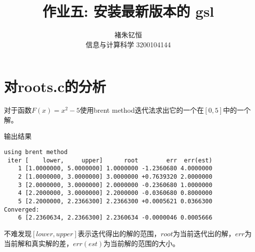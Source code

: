 \documentclass{article}
\title{作业五: 安装最新版本的 gsl}
\author{褚朱钇恒 \\ 信息与计算科学 3200104144}
\begin{document}
\maketitle
\section{对roots.c的分析}
     对于函数$F(x)=x^2-5$使用brent method迭代法求出它的一个在$[0,5]$中的一个解。

     输出结果
\begin{verbatim}
using brent method
 iter [    lower,     upper]      root        err  err(est)
    1 [1.0000000, 5.0000000] 1.0000000 -1.2360680 4.0000000
    2 [1.0000000, 3.0000000] 3.0000000 +0.7639320 2.0000000
    3 [2.0000000, 3.0000000] 2.0000000 -0.2360680 1.0000000
    4 [2.2000000, 3.0000000] 2.2000000 -0.0360680 0.8000000
    5 [2.2000000, 2.2366300] 2.2366300 +0.0005621 0.0366300
Converged:
    6 [2.2360634, 2.2366300] 2.2360634 -0.0000046 0.0005666
\end{verbatim}
     不难发现$[lower,upper]$表示迭代得出的解的范围，$root$为当前迭代出的解，$err$为当前解和真实解的差，$err(est)$为当前解的范围的大小。
\end{document}
